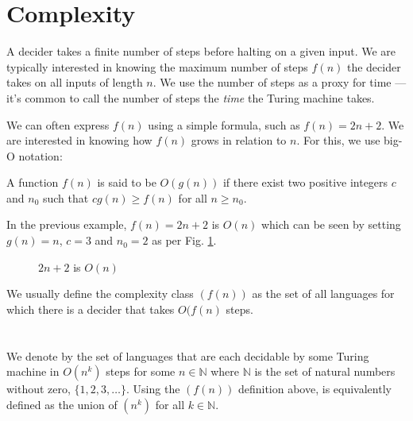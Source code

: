 \section{Complexity}
  A decider takes a finite number of steps before halting on a given input.
  We are typically interested in knowing the maximum number of steps \( f(n) \) the decider takes on all inputs of length \( n \).
  We use the number of steps as a proxy for time --- it's common to call the number of steps the \emph{time} the Turing machine takes.
  
  We can often express \( f(n) \) using a simple formula, such as \( f(n) = 2n + 2 \).
  We are interested in knowing how \( f(n) \) grows in relation to \( n \).
  For this, we use big-O notation:
  \begin{definition}
    A function \( f(n) \) is said to be \( O(g(n)) \) if there exist two positive integers \( c \) and \( n_0 \) such that \( cg(n) \geq f(n) \) for all \(n \geq n_0 \).
  \end{definition}
  In the previous example, \( f(n) = 2n + 2 \) is \( O(n) \) which can be seen by setting \( g(n) = n \), \( c = 3 \) and \( n_0 = 2 \) as per Fig. \ref{plot:2n2}.
  \begin{figure}[H]
  \caption{\( 2n + 2 \) is \( O(n) \)}
  \label{plot:2n2}
  \end{figure}
  We usually define the complexity class \((f(n)) \) as the set of all languages for which there is a decider that takes \( O(f(n) \) steps.

\section{}
  We denote by  the set of languages that are each decidable by some Turing machine in \( O(n^k) \) steps for some \( n \in \mathbb{N} \) where \( \mathbb{N} \) is the set of natural numbers without zero, \( \{ 1, 2, 3, \ldots\} \).
  Using the \((f(n)) \) definition above,  is equivalently defined as the union of \((n^k)\) for all \( k \in \mathbb{N} \).
  
